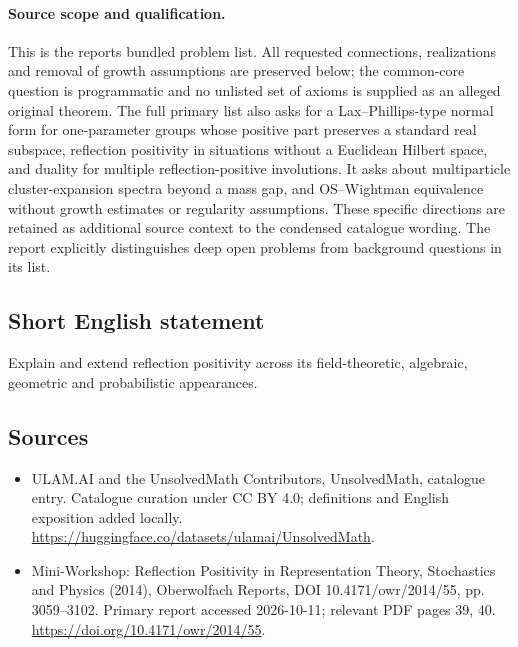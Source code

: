 \documentclass[11pt]{article}
\begin{document}
\paragraph{Source scope and qualification.}
This is the report\textquotesingle s bundled problem list. All requested connections, realizations and removal of growth assumptions are preserved below; the common-core question is programmatic and no unlisted set of axioms is supplied as an alleged original theorem. The full primary list also asks for a Lax--Phillips-type normal form for one-parameter groups whose positive part preserves a standard real subspace, reflection positivity in situations without a Euclidean Hilbert space, and duality for multiple reflection-positive involutions. It asks about multiparticle cluster-expansion spectra beyond a mass gap, and OS--Wightman equivalence without growth estimates or regularity assumptions. These specific directions are retained as additional source context to the condensed catalogue wording. The report explicitly distinguishes deep open problems from background questions in its list.
\subsection{Short English statement}
Explain and extend reflection positivity across its field-theoretic, algebraic, geometric and probabilistic appearances.
\subsection{Sources}
\begin{itemize}
\item[\hypertarget{source:statement:1}{S1}] ULAM.AI and the UnsolvedMath Contributors, UnsolvedMath, catalogue entry. Catalogue curation under CC BY 4.0; definitions and English exposition added locally.
\url{https://huggingface.co/datasets/ulamai/UnsolvedMath}.
\item[\hypertarget{source:statement:2}{S2}] Mini-Workshop: Reflection Positivity in Representation Theory, Stochastics and Physics (2014), Oberwolfach Reports, DOI 10.4171/owr/2014/55, pp. 3059--3102. Primary report accessed 2026-10-11; relevant PDF pages 39, 40.
\url{https://doi.org/10.4171/owr/2014/55}.
\end{itemize}
\label{end:statement}
\end{document}
